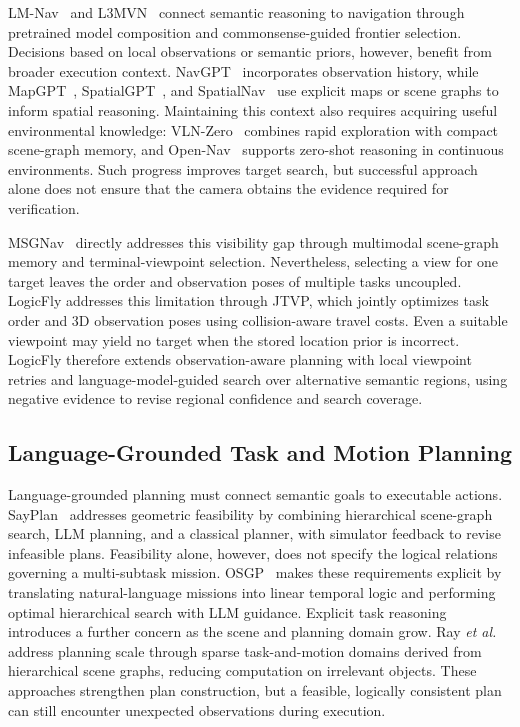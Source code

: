 \documentclass[letterpaper,10pt,journal]{IEEEtran}
\begin{document}
LM-Nav~\cite{shah2023lmnav} and L3MVN~\cite{yu2023l3mvn} connect semantic reasoning to navigation through pretrained model composition and commonsense-guided frontier selection. Decisions based on local observations or semantic priors, however, benefit from broader execution context. NavGPT~\cite{zhou2024navgpt} incorporates observation history, while MapGPT~\cite{chen2024mapgpt}, SpatialGPT~\cite{jiang2025spatialgpt}, and SpatialNav~\cite{zhang2026spatialnav} use explicit maps or scene graphs to inform spatial reasoning. Maintaining this context also requires acquiring useful environmental knowledge: VLN-Zero~\cite{bhatt2025vlnzero} combines rapid exploration with compact scene-graph memory, and Open-Nav~\cite{qiao2025opennav} supports zero-shot reasoning in continuous environments. Such progress improves target search, but successful approach alone does not ensure that the camera obtains the evidence required for verification.

MSGNav~\cite{huang2026msgnav} directly addresses this visibility gap through multimodal scene-graph memory and terminal-viewpoint selection. Nevertheless, selecting a view for one target leaves the order and observation poses of multiple tasks uncoupled. LogicFly addresses this limitation through JTVP, which jointly optimizes task order and 3D observation poses using collision-aware travel costs. Even a suitable viewpoint may yield no target when the stored location prior is incorrect. LogicFly therefore extends observation-aware planning with local viewpoint retries and language-model-guided search over alternative semantic regions, using negative evidence to revise regional confidence and search coverage.

\subsection{Language-Grounded Task and Motion Planning}

Language-grounded planning must connect semantic goals to executable actions. SayPlan~\cite{rana2023sayplan} addresses geometric feasibility by combining hierarchical scene-graph search, LLM planning, and a classical planner, with simulator feedback to revise infeasible plans. Feasibility alone, however, does not specify the logical relations governing a multi-subtask mission. OSGP~\cite{dai2024osgp} makes these requirements explicit by translating natural-language missions into linear temporal logic and performing optimal hierarchical search with LLM guidance. Explicit task reasoning introduces a further concern as the scene and planning domain grow. Ray \emph{et al.}~\cite{ray2024tamp} address planning scale through sparse task-and-motion domains derived from hierarchical scene graphs, reducing computation on irrelevant objects. These approaches strengthen plan construction, but a feasible, logically consistent plan can still encounter unexpected observations during execution.
\end{document}

